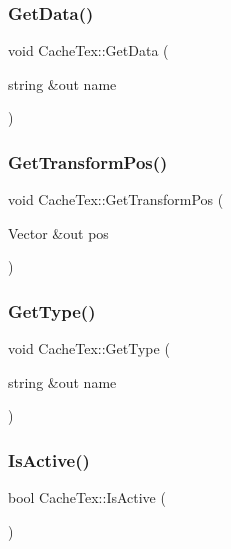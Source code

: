 \hypertarget{class_cache_tex_ad5141c707c0a051e3ba673953b684747}{}\label{class_cache_tex_ad5141c707c0a051e3ba673953b684747} 
\subsubsection{\texorpdfstring{Get\+Data()}{GetData()}}
{\footnotesize\ttfamily void Cache\+Tex\+::\+Get\+Data (\begin{DoxyParamCaption}\item[{string \&out}]{name }\end{DoxyParamCaption})}

\hypertarget{class_cache_tex_a0462e888ac55e8eaf5ffbc8d5b73c427}{}\label{class_cache_tex_a0462e888ac55e8eaf5ffbc8d5b73c427} 
\subsubsection{\texorpdfstring{Get\+Transform\+Pos()}{GetTransformPos()}}
{\footnotesize\ttfamily void Cache\+Tex\+::\+Get\+Transform\+Pos (\begin{DoxyParamCaption}\item[{Vector \&out}]{pos }\end{DoxyParamCaption})}

\hypertarget{class_cache_tex_a320c7b72655659a76350bf80db3b0be2}{}\label{class_cache_tex_a320c7b72655659a76350bf80db3b0be2} 
\subsubsection{\texorpdfstring{Get\+Type()}{GetType()}}
{\footnotesize\ttfamily void Cache\+Tex\+::\+Get\+Type (\begin{DoxyParamCaption}\item[{string \&out}]{name }\end{DoxyParamCaption})}

\hypertarget{class_cache_tex_aae46eb99479c83fd50cbe81a5e02254c}{}\label{class_cache_tex_aae46eb99479c83fd50cbe81a5e02254c} 
\subsubsection{\texorpdfstring{Is\+Active()}{IsActive()}}
{\footnotesize\ttfamily bool Cache\+Tex\+::\+Is\+Active (\begin{DoxyParamCaption}{ }\end{DoxyParamCaption})}

